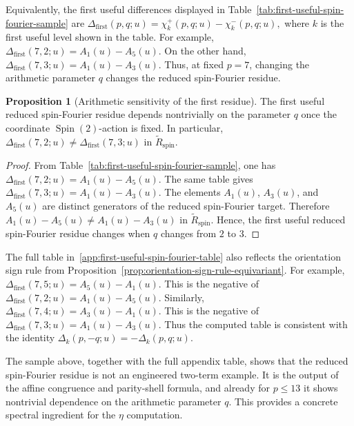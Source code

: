 \documentclass{article}
\theoremstyle{definition}
\newtheorem{proposition}[theorem]{Proposition}
\numberwithin{equation}{section}
\begin{document}
Equivalently, the first useful differences displayed in Table~\ref{tab:first-useful-spin-fourier-sample} are $\Delta_{\text{first}}(p,q;u)=\chi_k^+(p,q;u)-\chi_k^-(p,q;u),$ where $k$ is the first useful level shown in the table.  For example, $\Delta_{\text{first}}(7,2;u)=A_1(u)-A_5(u).$ On the other hand, $\Delta_{\text{first}}(7,3;u)=A_1(u)-A_3(u).$ Thus, at fixed $p=7$, changing the arithmetic parameter $q$ changes the reduced spin-Fourier residue.

\begin{proposition}[Arithmetic sensitivity of the first residue]
\label{prop:arithmetic-sensitivity-first-residue}
The first useful reduced spin-Fourier residue depends nontrivially on the parameter $q$ once the coordinate $\operatorname{Spin}(2)$-action is fixed.  In particular, $\Delta_{\text{first}}(7,2;u)\neq \Delta_{\text{first}}(7,3;u)$ in $\widetilde R_{\operatorname{spin}}$.
\end{proposition}

\begin{proof}
From Table~\ref{tab:first-useful-spin-fourier-sample}, one has $\Delta_{\text{first}}(7,2;u)=A_1(u)-A_5(u).$ The same table gives $\Delta_{\text{first}}(7,3;u)=A_1(u)-A_3(u).$ The elements $A_1(u)$, $A_3(u)$, and $A_5(u)$ are distinct generators of the reduced spin-Fourier target.  Therefore $A_1(u)-A_5(u)\neq A_1(u)-A_3(u)$ in $\widetilde R_{\operatorname{spin}}$. Hence, the first useful reduced spin-Fourier residue changes when $q$ changes from $2$ to $3$.
\end{proof}

The full table in~\autoref{app:first-useful-spin-fourier-table} also reflects the orientation sign rule from Proposition~\ref{prop:orientation-sign-rule-equivariant}.  For example, $\Delta_{\text{first}}(7,5;u)=A_5(u)-A_1(u).$ This is the negative of $\Delta_{\text{first}}(7,2;u)=A_1(u)-A_5(u).$ Similarly, $\Delta_{\text{first}}(7,4;u)=A_3(u)-A_1(u).$ This is the negative of $\Delta_{\text{first}}(7,3;u)=A_1(u)-A_3(u).$ Thus the computed table is consistent with the identity $\Delta_k(p,-q;u)=-\Delta_k(p,q;u).$ 

The sample above, together with the full appendix table, shows that the reduced spin-Fourier residue is not an engineered two-term example.  It is the output of the affine congruence and parity-shell formula, and already for $p\leq13$ it shows nontrivial dependence on the arithmetic parameter $q$.  This provides a concrete spectral ingredient for the $\eta$ computation.
\end{document}
